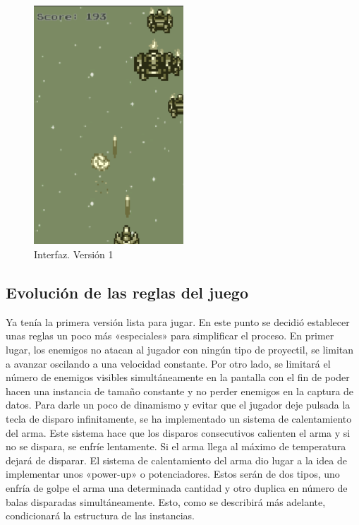 \begin{figure}[]
\centering
\includegraphics[width=0.5\textwidth]{./img/ifaz_v1}
\caption{Interfaz. Versión 1}
\end{figure}

\subsection{Evolución de las reglas del juego}

Ya tenía la primera versión lista para jugar. En este punto se decidió establecer unas reglas un poco más «especiales» para simplificar el proceso. En primer lugar, los enemigos no atacan al jugador con ningún tipo de proyectil, se limitan a avanzar oscilando a una velocidad constante. Por otro lado, se limitará el número de enemigos visibles simultáneamente en la pantalla con el fin de poder hacen una instancia de tamaño constante y no perder enemigos en la captura de datos. Para darle un poco de dinamismo y evitar que el jugador deje pulsada la tecla de disparo infinitamente, se ha implementado un sistema de calentamiento del arma. Este sistema hace que los disparos consecutivos calienten el arma y si no se dispara, se enfríe lentamente. Si el arma llega al máximo de temperatura dejará de disparar. El sistema de calentamiento del arma dio lugar a la idea de implementar unos «power-up» o potenciadores. Estos serán de dos tipos, uno enfría de golpe el arma una determinada cantidad y otro duplica en número de balas disparadas simultáneamente. Esto, como se describirá más adelante, condicionará la estructura de las instancias.

